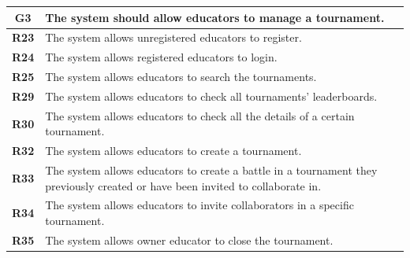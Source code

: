 \documentclass[12pt, a4paper]{report}
\begin{document}
    \begin{table}[H]
        \begin{tabularx}{\textwidth}{cX}
        \textbf{G3}  & The system should allow educators to manage a tournament.                                                                        \\ \hline
        \textbf{R23} & The system allows unregistered educators to register.                                                                            \\
        \textbf{R24} & The system allows registered educators to login.                                                                                 \\
        \textbf{R25} & The system allows educators to search the tournaments.                                                                           \\
        \textbf{R29} & The system allows educators to check all tournaments' leaderboards.                                                              \\
        \textbf{R30} & The system allows educators to check all the details of a certain tournament.                                                    \\
        \textbf{R32} & The system allows educators to create a tournament.                                                                              \\
        \textbf{R33} & The system allows educators to create a battle in a tournament they previously created or have been invited to collaborate in.   \\
        \textbf{R34} & The system allows educators to invite collaborators in a specific tournament.                                                    \\
        \textbf{R35} & The system allows owner educator to close the tournament.                                                                        \\
    \end{tabularx}
    \end{table}
\end{document}
